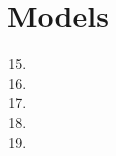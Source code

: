 \section{Models}

\solutions{}
\begin{enumerate}
  \setcounter{enumi}{14}
  \item %
  \item %
  \item %
  \item %
  \item %
\end{enumerate}
